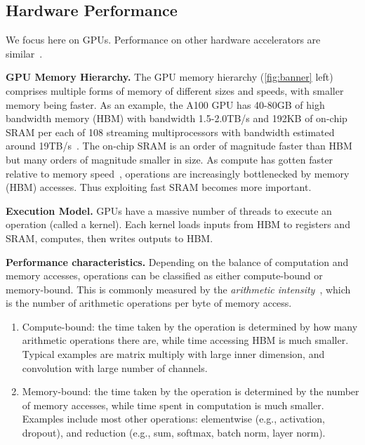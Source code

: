 \subsection{Hardware Performance}
\label{subsec:hardware}

We focus here on GPUs. Performance on other hardware accelerators are similar~\citep{jouppi2017datacenter, jia2019dissecting}.

\textbf{GPU Memory Hierarchy.} The GPU memory hierarchy (\ref{fig:banner} left) comprises multiple forms of memory of different sizes and speeds, with smaller memory being faster. As an example, the A100 GPU has 40-80GB of high bandwidth memory (HBM) with bandwidth 1.5-2.0TB/s and 192KB of on-chip SRAM per each of 108 streaming multiprocessors with bandwidth estimated around 19TB/s~\citep{jia2018dissecting, jia2021dissecting}. The on-chip SRAM is an order of magnitude faster than HBM but many orders of magnitude smaller in size. As compute has gotten faster relative to memory speed~\citep{nvidia2017nvidia,nvidia2020nvidia,nvidia2022nvidia}, operations are increasingly bottlenecked by memory (HBM) accesses. Thus exploiting fast SRAM becomes more important.

\textbf{Execution Model.} GPUs have a massive number of threads to execute an operation (called a kernel). Each kernel loads inputs from HBM to registers and SRAM, computes, then writes outputs to HBM.

\textbf{Performance characteristics.} Depending on the balance of computation and memory accesses, operations can be classified as either compute-bound or memory-bound. This is commonly measured by the \emph{arithmetic intensity}~\citep{williams2009roofline}, which is the number of arithmetic operations per byte of memory access.

\begin{enumerate}[itemsep=0.1pt,topsep=0pt,leftmargin=*]
  \item Compute-bound: the time taken by the operation is determined by how many arithmetic operations there are, while time accessing HBM is much smaller. Typical examples are matrix multiply with large inner dimension, and convolution with large number of channels.
  \item Memory-bound: the time taken by the operation is determined by the number of memory accesses, while time spent in computation is much smaller. Examples include most other operations: elementwise (e.g., activation, dropout), and reduction (e.g., sum, softmax, batch norm, layer norm).
\end{enumerate}

